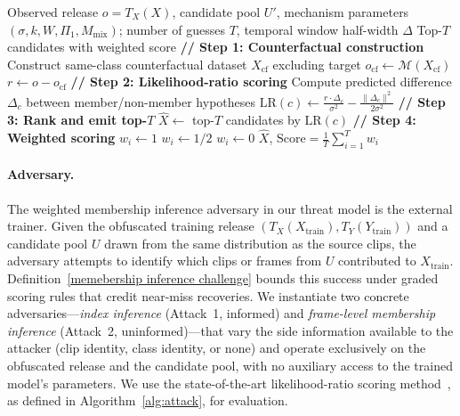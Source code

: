 \documentclass[letterpaper]{article} %
\begin{document}
\begin{algorithm}[t]
\caption{Weighted Membership Inference Attack (Adversary)}
\label{alg:attack}
\begin{algorithmic}[1]
\REQUIRE Observed release $o = T_X(X)$, candidate pool $U'$, mechanism parameters $(\sigma, k, W, \Pi_1, M_{\mathrm{mix}})$; number of guesses $T$, temporal window half-width $\Delta$
\ENSURE Top-$T$ candidates with weighted score
\STATE \textbf{// Step 1: Counterfactual construction}
\STATE Construct same-class counterfactual dataset $X_{\mathrm{cf}}$ excluding target
\STATE $o_{\mathrm{cf}} \leftarrow \mathcal{M}(X_{\mathrm{cf}})$
\STATE $r \leftarrow o - o_{\mathrm{cf}}$ 
\STATE \textbf{// Step 2: Likelihood-ratio scoring}
  \STATE Compute predicted difference $\Delta_c$ between member/non-member hypotheses
  \STATE $\mathrm{LR}(c) \leftarrow \frac{r \cdot \Delta_c}{\sigma^2} - \frac{\|\Delta_c\|^2}{2\sigma^2}$
\ENDFOR
\STATE \textbf{// Step 3: Rank and emit top-$T$}
\STATE $\hat{X} \leftarrow$ top-$T$ candidates by $\mathrm{LR}(c)$
\STATE \textbf{// Step 4: Weighted scoring}
    \STATE $w_i \leftarrow 1$
    \STATE $w_i \leftarrow 1/2$
  \ELSE
    \STATE $w_i \leftarrow 0$
  \ENDIF
\ENDFOR
\RETURN $\hat{X}$, $\mathrm{Score} = \frac{1}{T}\sum_{i=1}^T w_i$
\end{algorithmic}
\end{algorithm}


\paragraph{Adversary.}
The weighted membership inference adversary in our threat model is the external trainer. Given the obfuscated training release $(T_X(X_{\mathrm{train}}), T_Y(Y_{\mathrm{train}}))$ and a candidate pool $U$ drawn from the same distribution as the source clips, the adversary attempts to identify which clips or frames from $U$ contributed to $X_{\mathrm{train}}$. Definition~\ref{memebership inference challenge} bounds this success under graded scoring rules that credit near-miss recoveries. We instantiate two concrete adversaries---\emph{index inference} (Attack~1, informed) and \emph{frame-level membership inference} (Attack~2, uninformed)---that vary the side information available to the attacker (clip identity, class identity, or none) and operate exclusively on the obfuscated release and the candidate pool, with no auxiliary access to the trained model's parameters. We use the state-of-the-art likelihood-ratio scoring method~\cite{carlini2022firstprinciples}, as defined in Algorithm~\ref{alg:attack}, for evaluation.
\end{document}
